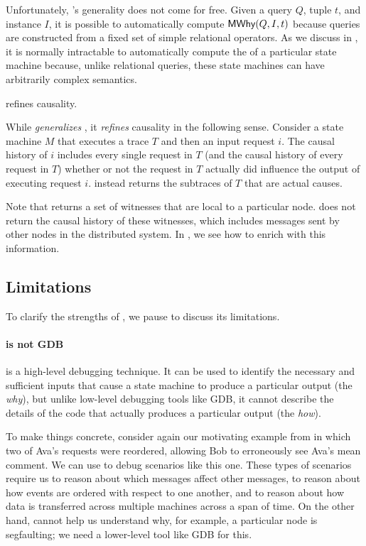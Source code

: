 Unfortunately, \watprovenance{}'s generality does not come for free. Given a
query $Q$, tuple $t$, and instance $I$, it is possible to automatically compute
$\textsf{MWhy}(Q, I, t)$ because queries are constructed from a fixed set of simple
relational operators. As we discuss in , it is normally
intractable to automatically compute the \watprovenance{} of a particular state
machine because, unlike relational queries, these state machines can have
arbitrarily complex semantics.

\begin{claim}
  \Watprovenance{} refines causality.
\end{claim}

While \watprovenance{} \emph{generalizes} \whyprovenance{}, it \emph{refines}
causality in the following sense. Consider a state machine $M$ that executes a
trace $T$ and then an input request $i$. The causal history of $i$ includes
every single request in $T$ (and the causal history of every request in $T$)
whether or not the request in $T$ actually did influence the output of
executing request $i$. \Watprovenance{} instead returns the subtraces of $T$
that are actual causes.

Note that \watprovenance{} returns a set of witnesses that are local to a
particular node. \Watprovenance{} does not return the causal history of these
witnesses, which includes messages sent by other nodes in the distributed
system. In , we see how to enrich \watprovenance{} with this
information.

\subsection{Limitations}
To clarify the strengths of \watprovenance{}, we pause to discuss its
limitations.

\paragraph{\Watprovenance{} is not GDB}
\Watprovenance{} is a high-level debugging technique. It can be used to
identify the necessary and sufficient inputs that cause a state machine to
produce a particular output (the \emph{why}), but unlike low-level debugging
tools like GDB, it cannot describe the details of the code that actually
produces a particular output (the \emph{how}).

To make things concrete, consider again our motivating example from
 in which two of Ava's requests were reordered,
allowing Bob to erroneously see Ava's mean comment. We can use \watprovenance{}
to debug scenarios like this one. These types of scenarios require us to reason
about which messages affect other messages, to reason about how events are
ordered with respect to one another, and to reason about how data is transferred
across multiple machines across a span of time. On the other hand,
\watprovenance{} cannot help us understand why, for example, a particular node
is segfaulting; we need a lower-level tool like GDB for this.

